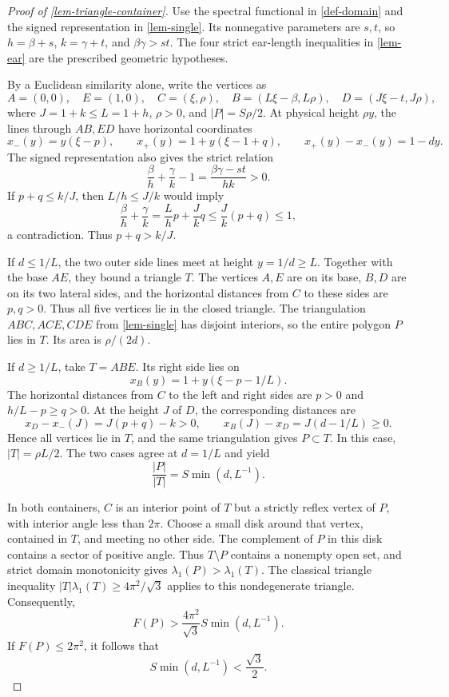 \documentclass[11pt,a4paper]{article}
\theoremstyle{proofmanuscript}
\begin{document}
\begin{proof}[Proof of \ref{lem-triangle-container}]

Use the spectral functional in \ref{def-domain} and the signed representation in \ref{lem-single}. Its nonnegative parameters are \(s,t\), so \(h=\beta+s\), \(k=\gamma+t\), and \(\beta\gamma>st\). The four strict ear-length inequalities in \ref{lem-ear} are the prescribed geometric hypotheses.

By a Euclidean similarity alone, write the vertices as \[
A=(0,0),\quad E=(1,0),\quad C=(\xi,\rho),\quad
B=(L\xi-\beta,L\rho),\quad D=(J\xi-t,J\rho),
\] where \(J=1+k\le L=1+h\), \(\rho>0\), and \(|P|=S\rho/2\). At physical height \(\rho y\), the lines through \(AB,ED\) have horizontal coordinates \[
x_-(y)=y(\xi-p),\qquad x_+(y)=1+y(\xi-1+q),
\qquad x_+(y)-x_-(y)=1-dy.
\] The signed representation also gives the strict relation \[
\frac\beta h+\frac\gamma k-1=\frac{\beta\gamma-st}{hk}>0.
\] If \(p+q\le k/J\), then \(L/h\le J/k\) would imply \[
\frac\beta h+\frac\gamma k=\frac Lh p+\frac Jk q
\le\frac Jk(p+q)\le1,
\] a contradiction. Thus \(p+q>k/J\).

If \(d\le1/L\), the two outer side lines meet at height \(y=1/d\ge L\). Together with the base \(AE\), they bound a triangle \(T\). The vertices \(A,E\) are on its base, \(B,D\) are on its two lateral sides, and the horizontal distances from \(C\) to these sides are \(p,q>0\). Thus all five vertices lie in the closed triangle. The triangulation \(ABC,ACE,CDE\) from \ref{lem-single} has disjoint interiors, so the entire polygon \(P\) lies in \(T\). Its area is \(\rho/(2d)\).

If \(d\ge1/L\), take \(T=ABE\). Its right side lies on \[
x_B(y)=1+y(\xi-p-1/L).
\] The horizontal distances from \(C\) to the left and right sides are \(p>0\) and \(h/L-p\ge q>0\). At the height \(J\) of \(D\), the corresponding distances are \[
x_D-x_-(J)=J(p+q)-k>0,\qquad
x_B(J)-x_D=J(d-1/L)\ge0.
\] Hence all vertices lie in \(T\), and the same triangulation gives \(P\subset T\). In this case, \(|T|=\rho L/2\). The two cases agree at \(d=1/L\) and yield \[
\frac{|P|}{|T|}=S\min(d,L^{-1}).\tag{G.9.1}
\]

In both containers, \(C\) is an interior point of \(T\) but a strictly reflex vertex of \(P\), with interior angle less than \(2\pi\). Choose a small disk around that vertex, contained in \(T\), and meeting no other side. The complement of \(P\) in this disk contains a sector of positive angle. Thus \(T\setminus P\) contains a nonempty open set, and strict domain monotonicity gives \(\lambda_1(P)>\lambda_1(T)\). The classical triangle inequality \(|T|\lambda_1(T)\ge4\pi^2/\sqrt3\) applies to this nondegenerate triangle. Consequently, \[
F(P)>\frac{4\pi^2}{\sqrt3}S\min(d,L^{-1}).
\] If \(F(P)\le2\pi^2\), it follows that \[
S\min(d,L^{-1})<\frac{\sqrt3}{2}.\tag{G.9.2}
\]

\end{proof}
\end{document}
